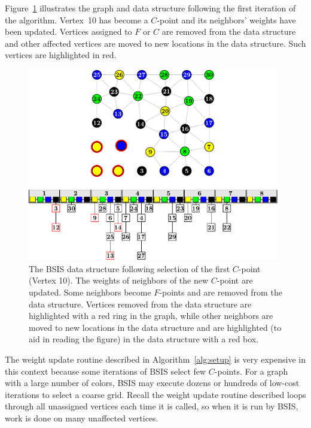 \documentclass{elsart}
\begin{document}
Figure~\ref{5:fig:bucket-algorithm-cp1} illustrates the graph and data
structure following the first iteration of the algorithm. Vertex~10
has become a $C$-point and its neighbors' weights have been
updated. Vertices assigned to $F$ or $C$ are removed from the data
structure and other affected vertices are moved to new locations in
the data structure. Such vertices are highlighted in red.
\begin{figure}
  \begin{center}
    \includegraphics[width=0.98\textwidth]{images/BSIS/cp1}
    \caption{The BSIS data structure following selection of the first
    $C$-point (Vertex 10). The weights of neighbors of the new
    $C$-point are updated. Some neighbors become $F$-points and are
    removed from the data structure. Vertices removed from the data
    structure are highlighted with a red ring in the graph, while
    other neighbors are moved to new locations in the data structure
    and are highlighted (to aid in reading the figure) in the data
    structure with a red box.}
    \label{5:fig:bucket-algorithm-cp1}
  \end{center}
\end{figure}

The weight update routine described in Algorithm~\ref{alg:setup} is
very expensive in this context because some iterations of BSIS select
few $C$-points. For a graph with a large number of colors, BSIS may
execute dozens or hundreds of low-cost iterations to select a coarse
grid. Recall the weight update routine described loops through all
unassigned vertices each time it is called, so when it is run by BSIS,
work is done on many unaffected vertices.
\end{document}
